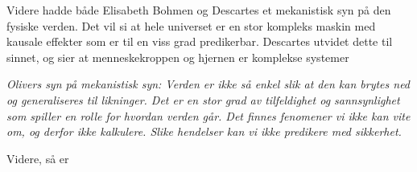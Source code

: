 \documentclass[11pt, a4paper]{article}
\begin{document}
Videre hadde både Elisabeth Bohmen og Descartes et mekanistisk syn på den fysiske verden. Det vil si at hele universet er en stor kompleks maskin med kausale effekter som er til en viss grad predikerbar. Descartes utvidet dette til sinnet, og sier at menneskekroppen og hjernen er komplekse systemer

\textit{Olivers syn på mekanistisk syn: Verden er ikke så enkel slik at den kan brytes ned og generaliseres til likninger. Det er en stor grad av tilfeldighet og sannsynlighet som spiller en rolle for hvordan verden går. Det finnes fenomener vi ikke kan vite om, og derfor ikke kalkulere. Slike hendelser kan vi ikke predikere med sikkerhet.}




Videre, så er 
\end{document}
